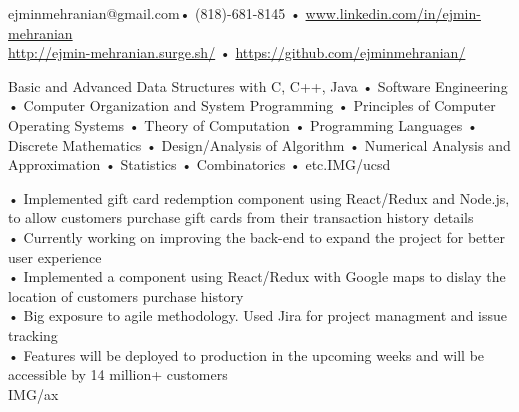 \documentclass[paper=a4,fontsize=11pt]{temp} %
\begin{document}
\begin{minipage}{1.0\linewidth}
   
   
    ejminmehranian@gmail.com\hspace{0.5cm}• \hspace{0.5cm} (818)-681-8145 \hspace{0.5cm} • \hspace{0.5cm} \url {www.linkedin.com/in/ejmin-mehranian} \\ \url{http://ejmin-mehranian.surge.sh/} \hspace{0.41cm}• \hspace{0.6cm} \url{https://github.com/ejminmehranian/}
 
\end{minipage}

\noindent


{Basic and Advanced Data Structures with C, C++, Java • Software Engineering • Computer Organization  and System Programming • Principles of Computer Operating Systems • Theory of Computation • Programming Languages • Discrete Mathematics • Design/Analysis of Algorithm • Numerical Analysis and Approximation • Statistics • Combinatorics • etc.}{IMG/ucsd}

\noindent

{• Implemented gift card redemption component using React/Redux and Node.js, to allow customers purchase gift cards from their transaction history details
\\ • Currently working on improving the back-end to expand the project for better user experience
\\ • Implemented a component using React/Redux with Google maps to dislay the location of customers purchase history
\\ • Big exposure to agile methodology. Used Jira for project managment and issue tracking
\\ • Features will be deployed to production in the upcoming weeks and will be accessible by 14 million+ customers
\\   } {IMG/ax}
\end{document}
